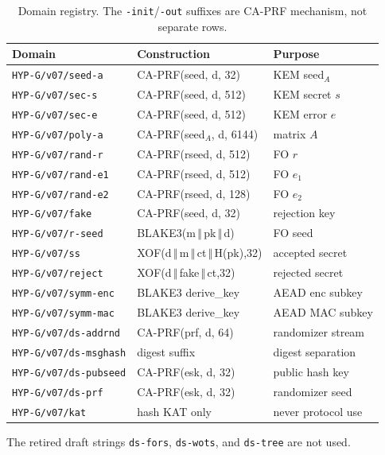 \documentclass[runningheads]{llncs}
\newcommand{\concat}{\,\Vert\,}
\begin{document}
\begin{longtable}{@{}lll@{}}
\caption{Domain registry.  The \texttt{-init}/\texttt{-out} suffixes are
CA-PRF mechanism, not separate rows.}\\
\toprule
Domain & Construction & Purpose \\
\midrule
\endhead
\texttt{HYP-G/v07/seed-a} & CA-PRF(seed, d, 32) & KEM seed$_A$ \\
\texttt{HYP-G/v07/sec-s} & CA-PRF(seed, d, 512) & KEM secret $s$ \\
\texttt{HYP-G/v07/sec-e} & CA-PRF(seed, d, 512) & KEM error $e$ \\
\texttt{HYP-G/v07/poly-a} & CA-PRF(seed$_A$, d, 6144) & matrix $A$ \\
\texttt{HYP-G/v07/rand-r} & CA-PRF(rseed, d, 512) & FO $r$ \\
\texttt{HYP-G/v07/rand-e1} & CA-PRF(rseed, d, 512) & FO $e_1$ \\
\texttt{HYP-G/v07/rand-e2} & CA-PRF(rseed, d, 128) & FO $e_2$ \\
\texttt{HYP-G/v07/fake} & CA-PRF(seed, d, 32) & rejection key \\
\texttt{HYP-G/v07/r-seed} & BLAKE3(m$\concat$pk$\concat$d) & FO seed \\
\texttt{HYP-G/v07/ss} & XOF(d$\concat$m$\concat$ct$\concat$H(pk),32) & accepted secret \\
\texttt{HYP-G/v07/reject} & XOF(d$\concat$fake$\concat$ct,32) & rejected secret \\
\texttt{HYP-G/v07/symm-enc} & BLAKE3 derive\_key & AEAD enc subkey \\
\texttt{HYP-G/v07/symm-mac} & BLAKE3 derive\_key & AEAD MAC subkey \\
\texttt{HYP-G/v07/ds-addrnd} & CA-PRF(prf, d, 64) & randomizer stream \\
\texttt{HYP-G/v07/ds-msghash} & digest suffix & digest separation \\
\texttt{HYP-G/v07/ds-pubseed} & CA-PRF(esk, d, 32) & public hash key \\
\texttt{HYP-G/v07/ds-prf} & CA-PRF(esk, d, 32) & randomizer seed \\
\texttt{HYP-G/v07/kat} & hash KAT only & never protocol use \\
\bottomrule
\end{longtable}

The retired draft strings \texttt{ds-fors}, \texttt{ds-wots}, and
\texttt{ds-tree} are not used.

\end{document}
